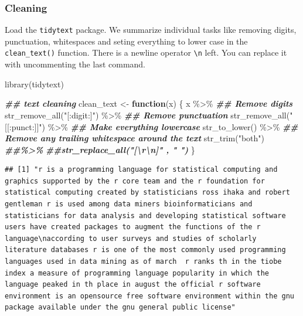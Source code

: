 \documentclass[
]{book}
\newenvironment{Shaded}{\begin{snugshade}}{\end{snugshade}}
\newcommand{\ControlFlowTok}[1]{\textcolor[rgb]{0.13,0.29,0.53}{\textbf{#1}}}
\newcommand{\DocumentationTok}[1]{\textcolor[rgb]{0.56,0.35,0.01}{\textbf{\textit{#1}}}}
\newcommand{\FunctionTok}[1]{\textcolor[rgb]{0.00,0.00,0.00}{#1}}
\newcommand{\NormalTok}[1]{#1}
\newcommand{\OtherTok}[1]{\textcolor[rgb]{0.56,0.35,0.01}{#1}}
\newcommand{\SpecialCharTok}[1]{\textcolor[rgb]{0.00,0.00,0.00}{#1}}
\newcommand{\StringTok}[1]{\textcolor[rgb]{0.31,0.60,0.02}{#1}}
\begin{document}
\hypertarget{cleaning}{%
\subsubsection{Cleaning}\label{cleaning}}

Load the \texttt{tidytext} package. We summarize individual tasks like removing digits, punctuation, whitespaces and seting everything to lower case in the \texttt{clean\_text()} function. There is a newline operator \texttt{\textbackslash{}n} left. You can replace it with uncommenting the last command.

\begin{Shaded}
\begin{Highlighting}[]
\FunctionTok{library}\NormalTok{(tidytext)}

\DocumentationTok{\#\# text cleaning}
\NormalTok{clean\_text }\OtherTok{\textless{}{-}} \ControlFlowTok{function}\NormalTok{(x) \{}
\NormalTok{  x }\SpecialCharTok{\%\textgreater{}\%}
    \DocumentationTok{\#\# Remove digits}
    \FunctionTok{str\_remove\_all}\NormalTok{(}\StringTok{"[:digit:]"}\NormalTok{) }\SpecialCharTok{\%\textgreater{}\%}
    \DocumentationTok{\#\# Remove punctuation}
    \FunctionTok{str\_remove\_all}\NormalTok{(}\StringTok{"[[:punct:]]"}\NormalTok{) }\SpecialCharTok{\%\textgreater{}\%}
    \DocumentationTok{\#\# Make everything lowercase}
    \FunctionTok{str\_to\_lower}\NormalTok{() }\SpecialCharTok{\%\textgreater{}\%}
    \DocumentationTok{\#\# Remove any trailing whitespace around the text}
    \FunctionTok{str\_trim}\NormalTok{(}\StringTok{"both"}\NormalTok{) }\DocumentationTok{\#\#\%\textgreater{}\%}
    \DocumentationTok{\#\#str\_replace\_all("[\textbackslash{}r\textbackslash{}n]" , " ")}
\NormalTok{\}}
\end{Highlighting}
\end{Shaded}

\begin{verbatim}
## [1] "r is a programming language for statistical computing and graphics supported by the r core team and the r foundation for statistical computing created by statisticians ross ihaka and robert gentleman r is used among data miners bioinformaticians and statisticians for data analysis and developing statistical software users have created packages to augment the functions of the r language\naccording to user surveys and studies of scholarly literature databases r is one of the most commonly used programming languages used in data mining as of march  r ranks th in the tiobe index a measure of programming language popularity in which the language peaked in th place in august the official r software environment is an opensource free software environment within the gnu package available under the gnu general public license"
\end{verbatim}
\end{document}

